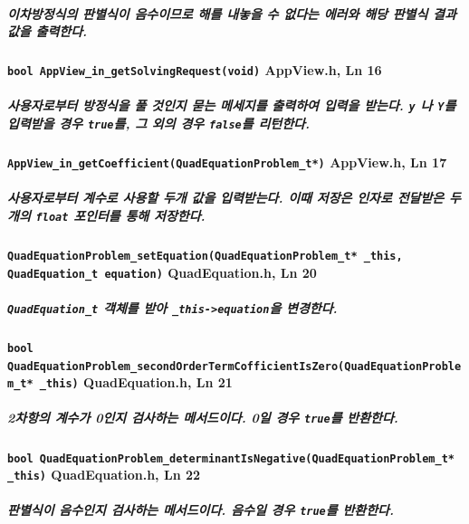 \documentclass{article}
\begin{document}
    \subparagraph{\normalfont 이차방정식의 판별식이 음수이므로 해를 내놓을 수 없다는 에러와 해당 판별식 결과값을 출력한다.}

    \paragraph{\large\texttt{bool AppView\_in\_getSolvingRequest(void)} \tiny AppView.h, Ln 16}

    \subparagraph{\normalfont 사용자로부터 방정식을 풀 것인지 묻는 메세지를 출력하여 입력을 받는다. \texttt{y} 나 \texttt{Y}를 입력받을 경우 \texttt{true}를, 그 외의 경우 \texttt{false}를 리턴한다.}

    \paragraph{\large\texttt{AppView\_in\_getCoefficient(QuadEquationProblem\_t*)} \tiny AppView.h, Ln 17}

    \subparagraph{\normalfont 사용자로부터 계수로 사용할 두개 값을 입력받는다. 이때 저장은 인자로 전달받은 두개의 \texttt{float} 포인터를 통해 저장한다.}

    \paragraph{\large\texttt{QuadEquationProblem\_setEquation(QuadEquationProblem\_t* \_this, QuadEquation\_t equation)} \tiny QuadEquation.h, Ln 20}

    \subparagraph{\normalfont \texttt{QuadEquation\_t} 객체를 받아 \texttt{\_this->equation}을 변경한다. }

    \paragraph{\large\texttt{bool QuadEquationProblem\_secondOrderTermCofficientIsZero(QuadEquationProblem\_t* \_this)} \tiny QuadEquation.h, Ln 21}

    \subparagraph{\normalfont 2차항의 계수가 0인지 검사하는 메서드이다. 0일 경우 \texttt{true}를 반환한다.}

    \paragraph{\large\texttt{bool QuadEquationProblem\_determinantIsNegative(QuadEquationProblem\_t* \_this)} \tiny QuadEquation.h, Ln 22}

    \subparagraph{\normalfont 판별식이 음수인지 검사하는 메서드이다. 음수일 경우 \texttt{true}를 반환한다.}
\end{document}

